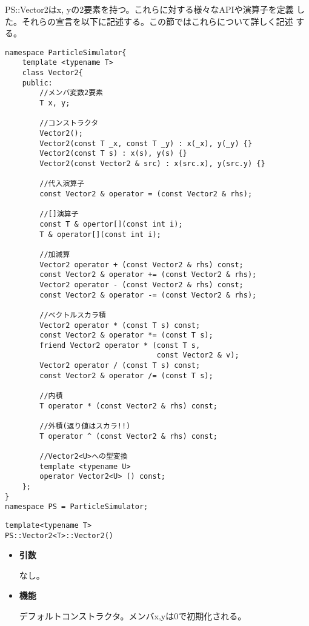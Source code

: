 PS::Vector2はx, yの2要素を持つ。これらに対する様々なAPIや演算子を定義
した。それらの宣言を以下に記述する。この節ではこれらについて詳しく記述
する。
\begin{lstlisting}[caption=Vector2]
namespace ParticleSimulator{
    template <typename T>
    class Vector2{
    public:
        //メンバ変数2要素
        T x, y;

        //コンストラクタ
        Vector2();
        Vector2(const T _x, const T _y) : x(_x), y(_y) {}
        Vector2(const T s) : x(s), y(s) {}
        Vector2(const Vector2 & src) : x(src.x), y(src.y) {}

        //代入演算子
        const Vector2 & operator = (const Vector2 & rhs);

        //[]演算子
        const T & opertor[](const int i);
        T & operator[](const int i);

        //加減算
        Vector2 operator + (const Vector2 & rhs) const;
        const Vector2 & operator += (const Vector2 & rhs);
        Vector2 operator - (const Vector2 & rhs) const;
        const Vector2 & operator -= (const Vector2 & rhs);

        //ベクトルスカラ積
        Vector2 operator * (const T s) const;
        const Vector2 & operator *= (const T s);
        friend Vector2 operator * (const T s,
                                   const Vector2 & v);
        Vector2 operator / (const T s) const;
        const Vector2 & operator /= (const T s);

        //内積
        T operator * (const Vector2 & rhs) const;

        //外積(返り値はスカラ!!)
        T operator ^ (const Vector2 & rhs) const;

        //Vector2<U>への型変換
        template <typename U>
        operator Vector2<U> () const;
    };
}
namespace PS = ParticleSimulator;
\end{lstlisting}


\begin{screen}
\begin{verbatim}
template<typename T>
PS::Vector2<T>::Vector2()
\end{verbatim}
\end{screen}

\begin{itemize}

\item{{\bf 引数}}

なし。

\item{{\bf 機能}}

デフォルトコンストラクタ。メンバx,yは0で初期化される。

\end{itemize}

